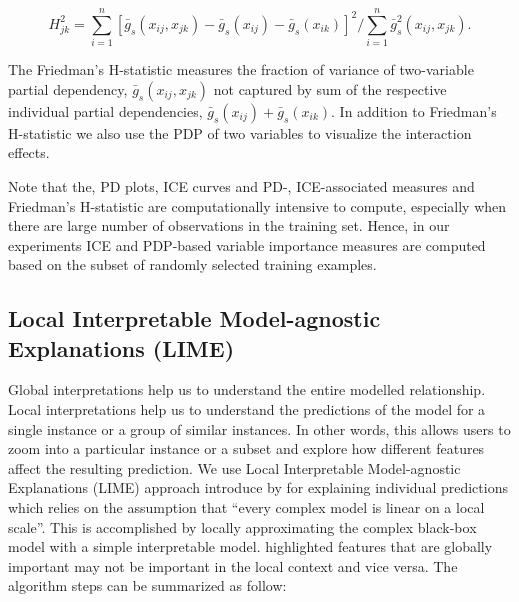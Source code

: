 \documentclass[11pt,a4paper,]{article}
\begin{document}
\[H_{jk}^2=\sum_{i=1}^{n}[\bar{g}_{s}(x_{ij}, x_{jk})-\bar{g}_{s}(x_{ij})-\bar{g}_{s}(x_{ik})]^2/\sum_{i=1}^{n}\bar{g}^2_{s}(x_{ij}, x_{jk}).\]

The Friedman's H-statistic measures the fraction of variance of
two-variable partial dependency, \(\bar{g}_{s}(x_{ij}, x_{jk})\) not
captured by sum of the respective individual partial dependencies,
\(\bar{g}_{s}(x_{ij})+\bar{g}_{s}(x_{ik})\). In addition to Friedman's
H-statistic we also use the PDP of two variables to visualize the
interaction effects.

Note that the, PD plots, ICE curves and PD-, ICE-associated measures and
Friedman's H-statistic are computationally intensive to compute,
especially when there are large number of observations in the training
set. Hence, in our experiments ICE and PDP-based variable importance
measures are computed based on the subset of randomly selected training
examples.

\subsection{Local Interpretable Model-agnostic Explanations
(LIME)}\label{local-interpretable-model-agnostic-explanations-lime}

Global interpretations help us to understand the entire modelled
relationship. Local interpretations help us to understand the
predictions of the model for a single instance or a group of similar
instances. In other words, this allows users to zoom into a particular
instance or a subset and explore how different features affect the
resulting prediction. We use Local Interpretable Model-agnostic
Explanations (LIME) approach introduce by \textcite{ribeiro2016should}
for explaining individual predictions which relies on the assumption
that ``every complex model is linear on a local scale''. This is
accomplished by locally approximating the complex black-box model with a
simple interpretable model. \textcite{ribeiro2016should} highlighted
features that are globally important may not be important in the local
context and vice versa. The algorithm steps can be summarized as follow:
\end{document}

